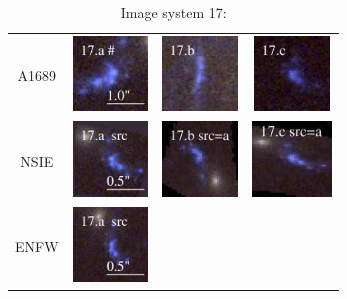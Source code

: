 \documentclass[useAMS,usenatbib]{mn2e}
\begin{document}
\begin{table}
  \caption{Image system 17:}\vspace{0mm}
  \begin{tabular}{cccc}
    \multicolumn{1}{m{1cm}}{{\Large A1689}}
    & \multicolumn{1}{m{1.7cm}}{\includegraphics[height=2.00cm,clip]{figs/nsie_img/rgb.img_17_a.ps}}
    & \multicolumn{1}{m{1.7cm}}{\includegraphics[height=2.00cm,clip]{figs/nsie_img/rgb.img_17_b.ps}}
    & \multicolumn{1}{m{1.7cm}}{\includegraphics[height=2.00cm,clip]{figs/nsie_img/rgb.img_17_c.ps}} \\
    \multicolumn{1}{m{1cm}}{{\Large NSIE}}
    & \multicolumn{1}{m{1.7cm}}{\includegraphics[height=2.00cm,clip]{figs/nsie_img/rgb.src_17_a.ps}}
    & \multicolumn{1}{m{1.7cm}}{\includegraphics[height=2.00cm,clip]{figs/nsie_img/rgb.pre_17_b_a_tri.ps}}
    & \multicolumn{1}{m{1.7cm}}{\includegraphics[height=2.00cm,clip]{figs/nsie_img/rgb.pre_17_c_a_tri.ps}} \\
    \multicolumn{1}{m{1cm}}{{\Large ENFW}}
    & \multicolumn{1}{m{1.7cm}}{\includegraphics[height=2.00cm,clip]{figs/enfw_img/rgb.src_17_a.ps}}

\end{tabular}
\end{table}
\end{document}
